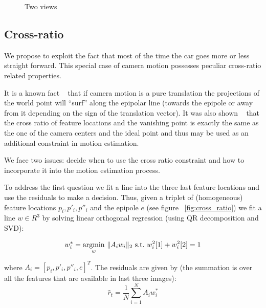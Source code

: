 \documentclass[10pt]{article}         %
\DeclarePairedDelimiter\norm{\lVert}{\rVert}%
\begin{document}
\begin{figure}[!h]
  \centering
  \caption{Two views}
  \label{fig:two_views}
\end{figure}

\subsection{Cross-ratio}\label{sec:cross_ratio}

We propose to exploit the fact that most of the time the car goes more
or less straight forward.  This special case of camera motion
possesses peculiar cross-ratio related properties.

It is a known fact ~\cite{Hartley2004} that if camera motion is a pure
translation the projections of the world point will ``surf'' along the
epipolar line (towards the epipole or away from it depending on the
sign of the translation vector). It was also shown
~\cite{basri1999visual} that the cross ratio of feature locations and
the vanishing point is exactly the same as the one of the camera
centers and the ideal point and thus may be used as an additional
constraint in motion estimation.

We face two issues: decide when to use the cross ratio constraint and
how to incorporate it into the motion estimation process.

To address the first question we fit a line into the three last
feature locations and use the residuals to make a decision.  Thus,
given a triplet of (homogeneous) feature locations $p_i,p'_i,p''_i$ and the epipole
$e$ (see figure ~\ref{fig:cross_ratio}) we fit a line $w\in R^3$ by solving linear orthogonal regression (using QR decomposition and SVD):

\[
w_i^* = \underset{w}{\text{argmin}} \ \norm{A_iw_i}_2\ \text{s.t.}\
w^2_i[1]+w^2_i[2]=1
\]

where $A_i=[p_i,p'_i,p''_i,e]^T$.  The residuals are given by (the
summation is over all the features that are available in last three
images):
\begin{equation}\label{eq:puret}
  \hat{r}_t = \frac{1}{N} \sum_{i=1}^N A_iw_i^*
\end{equation}
\end{document}
